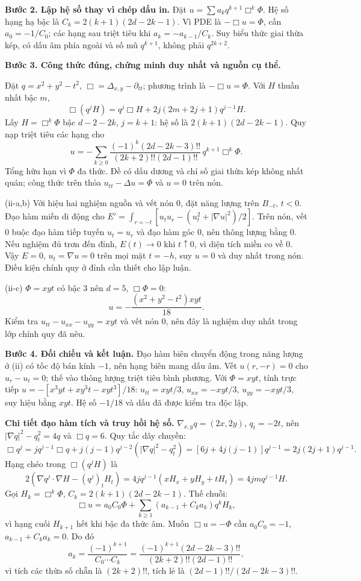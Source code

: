 \textbf{Bước 2. Lập hệ số thay vì chép dấu in.} Đặt $u=\sum a_kq^{k+1}\Box^k\Phi$. Hệ số hạng hạ bậc là $C_k=2(k+1)(2d-2k-1)$. Vì PDE là $-\Box u=\Phi$, cần $a_0=-1/C_0$; các hạng sau triệt tiêu khi $a_k=-a_{k-1}/C_k$. Suy biểu thức giai thừa kép, có dấu âm phía ngoài và số mũ $q^{k+1}$, không phải $q^{2k+2}$.

\textbf{Bước 3. Công thức đúng, chứng minh duy nhất và nguồn cụ thể.}

Đặt $q=x^2+y^2-t^2$, $\Box=\Delta_{x,y}-\partial_{tt}$; phương trình là $-\Box u=\Phi$. Với $H$ thuần nhất bậc $m$,
\[\Box(q^jH)=q^j\Box H+2j(2m+2j+1)q^{j-1}H.\]
Lấy $H=\Box^k\Phi$ bậc $d-2-2k$, $j=k+1$: hệ số là $2(k+1)(2d-2k-1)$. Quy nạp triệt tiêu các hạng cho
\[u=-\sum_{k\ge0}\frac{(-1)^k(2d-2k-3)!!}{(2k+2)!!(2d-1)!!}\,q^{k+1}\Box^k\Phi.\]
Tổng hữu hạn vì $\Phi$ đa thức. Đề có dấu dương và chỉ số giai thừa kép không nhất quán; công thức trên thỏa $u_{tt}-\Delta u=\Phi$ và $u=0$ trên nón.

(ii-a,b) Với hiệu hai nghiệm nguồn và vết nón 0, đặt năng lượng trên $B_{-t}$, $t<0$. Đạo hàm miền di động cho $E'=\int_{r=-t}[u_tu_r-(u_t^2+|\nabla u|^2)/2]$. Trên nón, vết 0 buộc đạo hàm tiếp tuyến $u_t=u_r$ và đạo hàm góc 0, nên thông lượng bằng 0. Nếu nghiệm đủ trơn đến đỉnh, $E(t)\to0$ khi $t\uparrow0$, vì diện tích miền co về 0. Vậy $E=0$, $u_t=\nabla u=0$ trên mọi mặt $t=-h$, suy $u=0$ và duy nhất trong nón. Điều kiện chính quy ở đỉnh cần thiết cho lập luận.

(ii-c) $\Phi=xyt$ có bậc 3 nên $d=5$, $\Box\Phi=0$:
\[u=-\frac{(x^2+y^2-t^2)xyt}{18}.\]
Kiểm tra $u_{tt}-u_{xx}-u_{yy}=xyt$ và vết nón 0, nên đây là nghiệm duy nhất trong lớp chính quy đã nêu.

\textbf{Bước 4. Đối chiếu và kết luận.} Đạo hàm biên chuyển động trong năng lượng ở (ii) có tốc độ bán kính $-1$, nên hạng biên mang dấu âm. Vết $u(r,-r)=0$ cho $u_r-u_t=0$; thế vào thông lượng triệt tiêu bình phương. Với $\Phi=xyt$, tính trực tiếp $u=-[x^3yt+xy^3t-xyt^3]/18$: $u_{tt}=xyt/3$, $u_{xx}=-xyt/3$, $u_{yy}=-xyt/3$, suy hiệu bằng $xyt$. Hệ số $-1/18$ và dấu đã được kiểm tra độc lập.

\textbf{Chi tiết đạo hàm tích và truy hồi hệ số.} $\nabla_{x,y}q=(2x,2y)$, $q_t=-2t$, nên $|\nabla q|^2-q_t^2=4q$ và $\Box q=6$. Quy tắc dây chuyền:
\[\Box q^j=j q^{j-1}\Box q+j(j-1)q^{j-2}(|\nabla q|^2-q_t^2)
=[6j+4j(j-1)]q^{j-1}=2j(2j+1)q^{j-1}.\]
Hạng chéo trong $\Box(q^jH)$ là
\[2(\nabla q^j\cdot\nabla H-(q^j)_tH_t)
=4jq^{j-1}(xH_x+yH_y+tH_t)=4jmq^{j-1}H.\]
Gọi $H_k=\Box^k\Phi$, $C_k=2(k+1)(2d-2k-1)$. Thế chuỗi:
\[\Box u=a_0C_0\Phi+\sum_{k\ge1}(a_{k-1}+C_ka_k)q^kH_k,\]
vì hạng cuối $H_{k+1}$ hết khi bậc đa thức âm. Muốn $\Box u=-\Phi$ cần $a_0C_0=-1$, $a_{k-1}+C_ka_k=0$. Do đó
\[a_k=\frac{(-1)^{k+1}}{C_0\cdots C_k}
=\frac{(-1)^{k+1}(2d-2k-3)!!}{(2k+2)!!(2d-1)!!},\]
vì tích các thừa số chẵn là $(2k+2)!!$, tích lẻ là $(2d-1)!!/(2d-2k-3)!!$.
